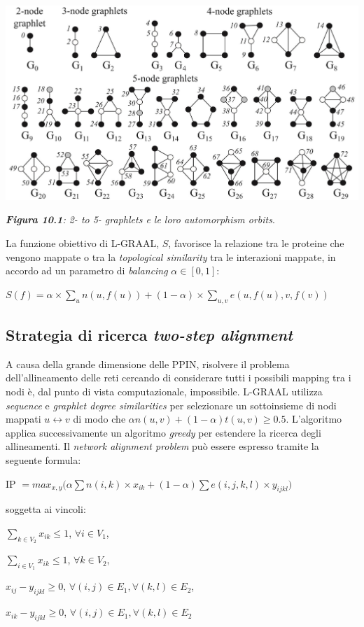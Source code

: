 \documentclass[11pt]{article}
\begin{document}
\begin{center}
\includegraphics[scale=0.33]{graal1}

\begin{small}\textit{\textbf{Figura 10.1}: 2- to 5- graphlets e le loro automorphism orbits}.\end{small}
\end{center}

La funzione obiettivo di L-GRAAL, $S$, favorisce la relazione tra le proteine che vengono mappate o tra la \textit{topological similarity} tra le interazioni mappate, in accordo ad un parametro di \textit{balancing} $\alpha \in [0,1]$:
\begin{center}
$S(f) = \alpha \times \displaystyle{\sum_{u}n(u,f(u)) + (1- \alpha) \times \sum_{u,v}e(u,f(u),v,f(v))}$
\end{center}

\subsection{Strategia di ricerca \textit{two-step alignment}}
A causa della grande dimensione delle PPIN, risolvere il problema dell'allineamento delle reti cercando di considerare tutti i possibili mapping tra i nodi è, dal punto di vista computazionale, impossibile. L-GRAAL utilizza \textit{sequence} e \textit{graphlet degree similarities} per selezionare un sottoinsieme di nodi mappati $u \longleftrightarrow v$ di modo che $\alpha n(u,v) + (1-\alpha)t(u,v) \geq 0.5$. L'algoritmo applica successivamente un algoritmo \textit{greedy} per estendere la ricerca degli allineamenti. Il \textit{network alignment problem} può essere espresso tramite la seguente formula:

\begin{center}
IP $= max_{x,y} \displaystyle{\Big( \alpha \sum n(i,k) \times x_{ik} + (1- \alpha) \sum e(i,j,k,l) \times y_{ijkl}} \Big)$
\end{center}
soggetta ai vincoli:
\begin{center}
$\displaystyle{\sum_{k \in V_2}x_{ik} \leq 1}$, $\forall i \in V_1$,

$\displaystyle{\sum_{i \in V_1}x_{ik} \leq 1}$, $\forall k \in V_2$,

$x_{ij} - y_{ijkl} \geq 0$, $\forall (i,j) \in E_1, \forall (k,l) \in E_2$,

$x_{ik} - y_{ijkl} \geq 0$, $\forall (i,j) \in E_1, \forall (k,l) \in E_2$
\end{center}
\end{document}
